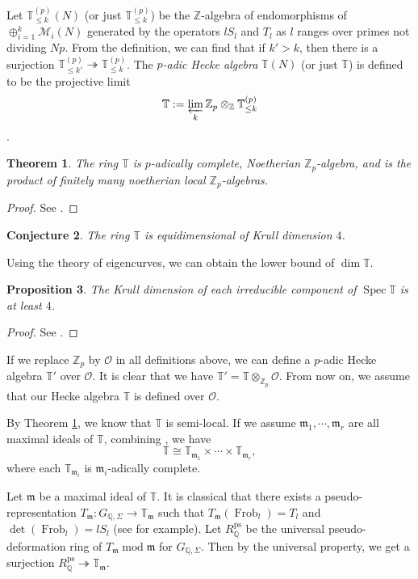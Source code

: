 \documentclass[a4paper, 12pt]{amsart}
\newtheorem{thm}{Theorem}[subsection]
\newtheorem{prop}[thm]{Proposition}
\newtheorem{conj}[thm]{Conjecture} \theoremstyle{definition}
\DeclareMathOperator{\modd}{mod}
\DeclareMathOperator{\Spec}{Spec}
\DeclareMathOperator{\Frob}{Frob}
\def\ps{\mathrm{ps}}
\newcommand{\Z}{\mathbb{Z}}
\newcommand{\Q}{\mathbb{Q}}
\newcommand{\T}{\mathbb{T}}
\newcommand{\cO}{\mathcal{O}}
\newcommand{\km}{\mathfrak{m}}
\begin{document}
    Let $\T_{\le k}^{(p)} (N)$ (or just $\T_{\le k}^{(p)}$) be the $\Z$-algebra of endomorphisms of $\oplus_{i=1}^k \mathcal{M}_i(N)$ generated by the operators $lS_l$ and $T_l$ as $l$ ranges over primes not dividing $Np$. From the definition, we can find that if $k' > k$, then there is a surjection $\T_{\le k'}^{(p)} \twoheadrightarrow \T_{\le k}^{(p)}$. The $p$\textit{-adic Hecke algebra} $\T(N)$ (or just $\T$) is defined to be the projective limit
    $$ \T:= \varprojlim_k \Z_p \otimes_\Z \T_{\le k}^{(p)}$$. 
    
    \begin{thm}\label{decomposition}
      The ring $\T$ is $p$-adically complete, Noetherian $\Z_p$-algebra, and is the product of finitely many noetherian local $\Z_p$-algebras.
    \end{thm}
   
   \begin{proof}
   	See \cite[Theorem 2.7]{Emerton2011}.
   \end{proof}
   
   \begin{conj}\cite[Conjecture 2.9]{Emerton2011}\label{conj}
   	The ring $\T$ is equidimensional of Krull dimension $4$.
   \end{conj}
    
    Using the theory of eigencurves, we can obtain the lower bound of $\dim \T$.
    
    \begin{prop}\label{lower bound}
    	The Krull dimension of each irreducible component of $\Spec \T$ is at least $4$.
    \end{prop}
    
    \begin{proof}
    	See \cite[Corollary 2.28]{Emerton2011}.
    \end{proof}
    
     If we replace $\Z_p$ by $\cO$ in all definitions above, we can define a $p$-adic Hecke algebra $\T'$ over $\cO$. It is clear that we have $\T' = \T \otimes_{\Z_p} \cO$. From now on, we assume that our Hecke algebra $\T$ is defined over $\cO$. 
    
    By Theorem \ref{decomposition}, we know that $\T$ is semi-local. If we assume $\km_1, \cdots, \km_r$ are all maximal ideals of $\T$, combining \cite[24.C]{matsumura80}, we have
    $$ \T \cong \T_{\km_1} \times \cdots \times \T_{\km_r},$$
    where each $ \T_{\km_i}$ is $\km_i$-adically complete.
    
    Let $\km$ be a maximal ideal of $\T$. It is classical that there exists a pseudo-representation $T_\km: G_{\Q, \Sigma} \to \T_\km$ such that $T_\km(\Frob_l)=T_l$ and $\det (\Frob_l)=lS_l$ (see \cite[Lemma 4.1]{Deo2023} for example). Let $R_{\Q}^\ps$ be the universal pseudo-deformation ring of $T_\km \modd \km$ for $G_{\Q, \Sigma}$. Then by the universal property, we get a surjection $R_{\Q}^\ps \twoheadrightarrow \T_\km$.
    
\end{document}
